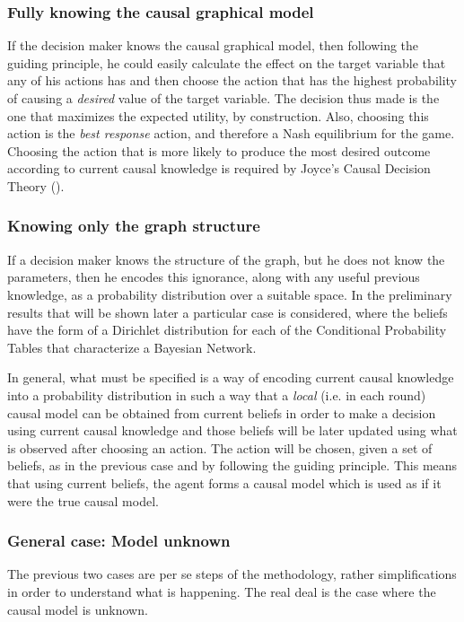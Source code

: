 \documentclass[english,letterpaper,12pt,final]{article}
\theoremstyle{definition}
\begin{document}
\subsubsection{Fully knowing the causal graphical model}
If the decision maker knows the causal graphical model, then following the guiding principle, he could easily calculate the effect on the target variable that any of his actions has and then choose the action that has the highest probability of causing a \textit{desired} value of the target variable. The decision thus made is the one that maximizes the expected utility, by construction. Also, choosing this action is the \textit{best response} action, and therefore a Nash equilibrium for the game. Choosing the action that is more likely to produce the most desired outcome according to current causal knowledge is required by Joyce's Causal Decision Theory (\cite{joyce1999foundations}).
\subsubsection{Knowing only the graph structure}
If a decision maker knows the structure of the graph, but he does not know the parameters, then he encodes this ignorance, along with any useful previous knowledge, as a probability distribution over a suitable space. In the preliminary results that will be shown later a particular case is considered, where the beliefs have the form of a Dirichlet distribution for each of the Conditional Probability Tables that characterize a Bayesian Network.

In general, what must be specified is a way of encoding current causal knowledge into a probability distribution in such a way that a \textit{local} (i.e. in each round) causal model can be obtained from current beliefs in order to make a decision using current causal knowledge and those beliefs will be later updated using what is observed after choosing an action.  The action will be chosen, given a set of beliefs, as in the previous case and by following the guiding principle. This means that using current beliefs, the agent forms a causal model which is used as if it were the true causal model.
\subsubsection{General case: Model unknown}
The previous two cases are per se steps of the methodology, rather simplifications in order to understand what is happening. The real deal is the case where the causal model is unknown. 
\end{document}
